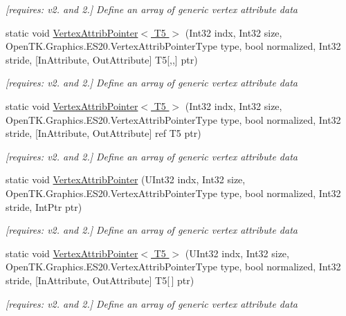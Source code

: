 \begin{DoxyCompactItemize}
\begin{DoxyCompactList}\small\item\em \mbox{[}requires\-: v2. and 2.\mbox{]} Define an array of generic vertex attribute data \end{DoxyCompactList}\item 
static void \hyperlink{class_open_t_k_1_1_graphics_1_1_e_s20_1_1_g_l_a458d68dd2cdf8558049634ef73c41d6d}{Vertex\-Attrib\-Pointer$<$ T5 $>$} (Int32 indx, Int32 size, Open\-T\-K.\-Graphics.\-E\-S20.\-Vertex\-Attrib\-Pointer\-Type type, bool normalized, Int32 stride, \mbox{[}In\-Attribute, Out\-Attribute\mbox{]} T5\mbox{[},,\mbox{]} ptr)
\begin{DoxyCompactList}\small\item\em \mbox{[}requires\-: v2. and 2.\mbox{]} Define an array of generic vertex attribute data \end{DoxyCompactList}\item 
static void \hyperlink{class_open_t_k_1_1_graphics_1_1_e_s20_1_1_g_l_a4e834ccfc1e0ccc0ae7300907d27f757}{Vertex\-Attrib\-Pointer$<$ T5 $>$} (Int32 indx, Int32 size, Open\-T\-K.\-Graphics.\-E\-S20.\-Vertex\-Attrib\-Pointer\-Type type, bool normalized, Int32 stride, \mbox{[}In\-Attribute, Out\-Attribute\mbox{]} ref T5 ptr)
\begin{DoxyCompactList}\small\item\em \mbox{[}requires\-: v2. and 2.\mbox{]} Define an array of generic vertex attribute data \end{DoxyCompactList}\item 
static void \hyperlink{class_open_t_k_1_1_graphics_1_1_e_s20_1_1_g_l_a3098c96c2f8474666e26226f9ced56ca}{Vertex\-Attrib\-Pointer} (U\-Int32 indx, Int32 size, Open\-T\-K.\-Graphics.\-E\-S20.\-Vertex\-Attrib\-Pointer\-Type type, bool normalized, Int32 stride, Int\-Ptr ptr)
\begin{DoxyCompactList}\small\item\em \mbox{[}requires\-: v2. and 2.\mbox{]} Define an array of generic vertex attribute data \end{DoxyCompactList}\item 
static void \hyperlink{class_open_t_k_1_1_graphics_1_1_e_s20_1_1_g_l_affd329a200ad7ebc16850dc51ae88f1c}{Vertex\-Attrib\-Pointer$<$ T5 $>$} (U\-Int32 indx, Int32 size, Open\-T\-K.\-Graphics.\-E\-S20.\-Vertex\-Attrib\-Pointer\-Type type, bool normalized, Int32 stride, \mbox{[}In\-Attribute, Out\-Attribute\mbox{]} T5\mbox{[}$\,$\mbox{]} ptr)
\begin{DoxyCompactList}\small\item\em \mbox{[}requires\-: v2. and 2.\mbox{]} Define an array of generic vertex attribute data \end{DoxyCompactList}\item 

\end{DoxyCompactItemize}
